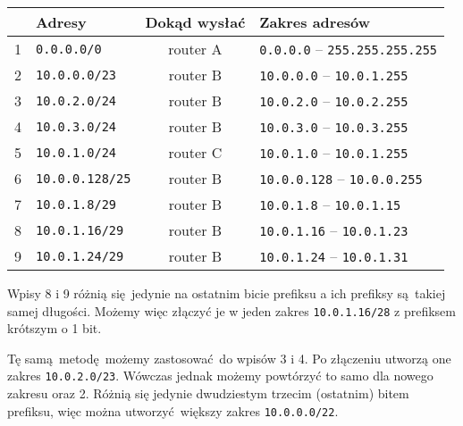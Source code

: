 \documentclass[a4paper, oneside]{article}
\begin{document}
\begin{description}
{        \begin{table}[H]
        \centering
        \begin{tabular}{|l|l|c|l|}
        \hline
            & \textbf{Adresy}     
            & \textbf{Dokąd wysłać} 
            & \textbf{Zakres adresów} \\ \hline \hline
        1   &  \texttt{0.0.0.0/0}
            & \cellcolor{blue!35}  router A 
            & \texttt{0.0.0.0} -- \texttt{255.255.255.255} \\ \hline
        2   & \texttt{10.0.0.0/23}   
            & \cellcolor{green!35} router B 
            & \texttt{10.0.0.0} -- \texttt{10.0.1.255} \\ \hline
        3   & \texttt{10.0.2.0/24}   
            & \cellcolor{green!35} router B 
            & \texttt{10.0.2.0} -- \texttt{10.0.2.255} \\ \hline
        4   & \texttt{10.0.3.0/24}   
            & \cellcolor{green!35} router B 
            & \texttt{10.0.3.0} -- \texttt{10.0.3.255} \\ \hline
        5   & \texttt{10.0.1.0/24}   
            & \cellcolor{red!35}   router C 
            & \texttt{10.0.1.0} -- \texttt{10.0.1.255} \\ \hline
        6   & \texttt{10.0.0.128/25} 
            & \cellcolor{green!35} router B 
            & \texttt{10.0.0.128} -- \texttt{10.0.0.255} \\ \hline
        7   &\texttt{10.0.1.8/29}   
            & \cellcolor{green!35} router B 
            & \texttt{10.0.1.8} -- \texttt{10.0.1.15} \\ \hline
        8   &\texttt{10.0.1.16/29}  
            & \cellcolor{green!35} router B 
            & \texttt{10.0.1.16} -- \texttt{10.0.1.23} \\ \hline
        9   &\texttt{10.0.1.24/29}  
            & \cellcolor{green!35} router B 
            & \texttt{10.0.1.24} -- \texttt{10.0.1.31} \\ \hline
        \end{tabular}
        \end{table}

        Wpisy 8 i 9 różnią się jedynie na ostatnim bicie prefiksu a ich 
        prefiksy są takiej samej długości. Możemy więc złączyć je w jeden zakres
        \texttt{10.0.1.16/28} z prefiksem krótszym o 1 bit.

        Tę samą metodę możemy zastosować do wpisów 3 i 4. Po złączeniu utworzą 
        one zakres \texttt{10.0.2.0/23}. Wówczas jednak możemy powtórzyć
        to samo dla nowego zakresu oraz 2. Różnią się jedynie dwudziestym
        trzecim (ostatnim) bitem prefiksu, więc można utworzyć większy
        zakres \texttt{10.0.0.0/22}.

}
\end{description}
\end{document}
